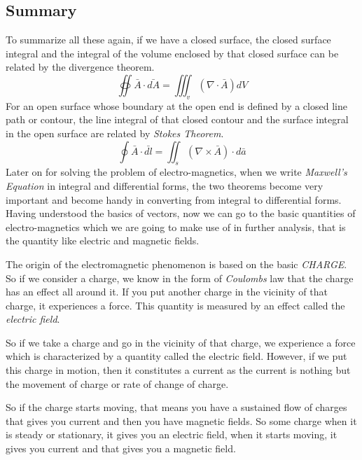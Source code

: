 \begin{mdframed}[ backgroundcolor=lightblue, linewidth=1pt, hidealllines=true]
\subsection{Summary}
To summarize all these again, if we have a closed surface, the closed surface integral and the integral of the volume enclosed by that closed surface can be related by the divergence theorem.
\begin{equation}
\oiint \bar{A}\cdot\bar{dA} = \iiint_v(\nabla\cdot\bar{A})dV
\end{equation}
For an open surface whose boundary at the open end is defined by a closed line path or contour, the line integral of that closed contour and the surface integral in the open surface are related by \emph{Stokes Theorem}.
\begin{equation}
\oint\bar{A}\cdot\bar{dl} = \iint_s(\nabla\times\bar{A})\cdot d\bar{a}
\end{equation}	
Later on for solving the problem of electro-magnetics, when we write \emph{Maxwell's Equation} in integral and differential forms, the two theorems become very important and become handy in converting from integral to differential forms. Having understood the basics of vectors, now we can go to the basic quantities of electro-magnetics which we are going to make use of in further analysis, that is the quantity like electric and magnetic fields.

The origin of the electromagnetic phenomenon is based on the basic \emph{CHARGE}. So if we consider a charge, we know in the form of \emph{Coulombs} law that the charge has an effect all around it. If you put another charge in the vicinity of that charge, it experiences a force. This quantity is measured by an effect called the \emph{electric field}.

So if we take a charge and go in the vicinity of that charge, we experience a force which is characterized by a quantity called the electric field. However, if we put this charge in motion, then it constitutes a current as the current is nothing but the movement of charge or rate of change of charge.

So if the charge starts moving, that means you have a sustained flow of charges that gives you current and then you have magnetic fields. So some charge when it is steady or stationary, it gives you an electric field, when it starts moving, it gives you current and that gives you a magnetic field.


\end{mdframed}
